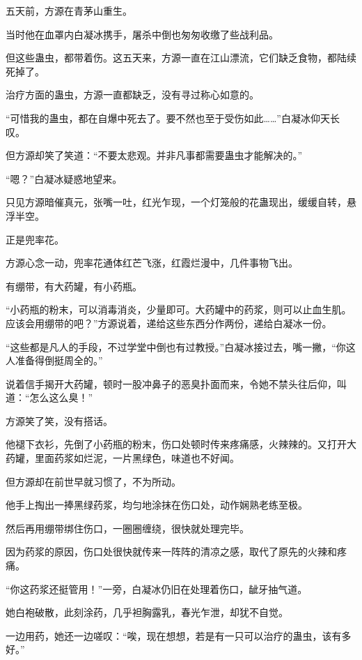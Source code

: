 
\begin{this_body}

五天前，方源在青茅山重生。

当时他在血罩内白凝冰携手，屠杀中倒也匆匆收缴了些战利品。

但这些蛊虫，都带着伤。这五天来，方源一直在江山漂流，它们缺乏食物，都陆续死掉了。

治疗方面的蛊虫，方源一直都缺乏，没有寻过称心如意的。

“可惜我的蛊虫，都在自爆中死去了。要不然也至于受伤如此……”白凝冰仰天长叹。

但方源却笑了笑道：“不要太悲观。并非凡事都需要蛊虫才能解决的。”

“嗯？”白凝冰疑惑地望来。

只见方源暗催真元，张嘴一吐，红光乍现，一个灯笼般的花蛊现出，缓缓自转，悬浮半空。

正是兜率花。

方源心念一动，兜率花通体红芒飞涨，红霞烂漫中，几件事物飞出。

有绷带，有大药罐，有小药瓶。

“小药瓶的粉末，可以消毒消炎，少量即可。大药罐中的药浆，则可以止血生肌。应该会用绷带的吧？”方源说着，递给这些东西分作两份，递给白凝冰一份。

“这些都是凡人的手段，不过学堂中倒也有过教授。”白凝冰接过去，嘴一撇，“你这人准备得倒挺周全的。”

说着信手揭开大药罐，顿时一股冲鼻子的恶臭扑面而来，令她不禁头往后仰，叫道：“怎么这么臭！”

方源笑了笑，没有搭话。

他褪下衣衫，先倒了小药瓶的粉末，伤口处顿时传来疼痛感，火辣辣的。又打开大药罐，里面药浆如烂泥，一片黑绿色，味道也不好闻。

但方源却在前世早就习惯了，不为所动。

他手上掏出一捧黑绿药浆，均匀地涂抹在伤口处，动作娴熟老练至极。

然后再用绷带绑住伤口，一圈圈缠绕，很快就处理完毕。

因为药浆的原因，伤口处很快就传来一阵阵的清凉之感，取代了原先的火辣和疼痛。

“你这药浆还挺管用！”一旁，白凝冰仍旧在处理着伤口，龇牙抽气道。

她白袍破散，此刻涂药，几乎袒胸露乳，春光乍泄，却犹不自觉。

一边用药，她还一边嗟叹：“唉，现在想想，若是有一只可以治疗的蛊虫，该有多好。”


\end{this_body}
